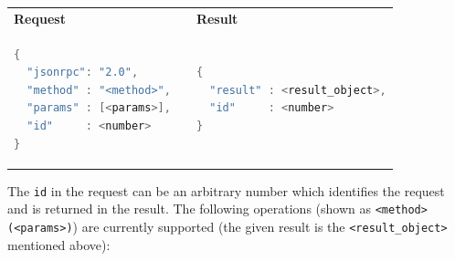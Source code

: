 \documentclass[a4paper]{scrreprt}
\newcommand{\code}[1]{\lstinline[basicstyle=\ttfamily]!#1!}
\begin{document}
\begin{tabular}{p{}cp{}}
\bf Request & & \bf Result \\
\begin{lstlisting}[language=java]
{
  "jsonrpc": "2.0",
  "method" : "<method>",
  "params" : [<params>],
  "id"     : <number>
}
\end{lstlisting}
& &
\begin{lstlisting}[language=java]
{
  "result" : <result_object>,
  "id"     : <number>
}
\end{lstlisting}
\end{tabular}

The \code{id} in the request can be an arbitrary number which identifies the
request and is returned in the result.
The following operations (shown as \code{<method>(<params>)}) are currently
supported (the given result is the \code{<result_object>} mentioned above):
\end{document}
